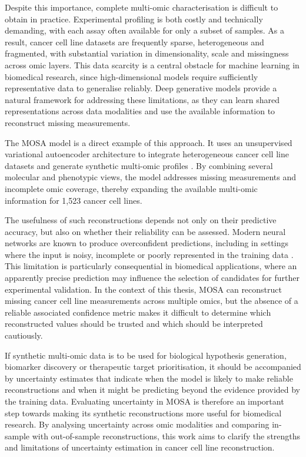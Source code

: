 Despite this importance, complete multi-omic characterisation is difficult to obtain in practice. Experimental profiling is both costly and technically demanding, with each assay often available for only a subset of samples. As a result, cancer cell line datasets are frequently sparse, heterogeneous and fragmented, with substantial variation in dimensionality, scale and missingness across omic layers. This data scarcity is a central obstacle for machine learning in biomedical research, since high-dimensional models require sufficiently representative data to generalise reliably. Deep generative models provide a natural framework for addressing these limitations, as they can learn shared representations across data modalities and use the available information to reconstruct missing measurements.

The \gls{MOSA} model is a direct example of this approach. It uses an unsupervised variational autoencoder architecture to integrate heterogeneous cancer cell line datasets and generate synthetic multi-omic profiles \cite{Cai2024}. By combining several molecular and phenotypic views, the model addresses missing measurements and incomplete omic coverage, thereby expanding the available multi-omic information for 1,523 cancer cell lines.

The usefulness of such reconstructions depends not only on their predictive accuracy, but also on whether their reliability can be assessed. Modern neural networks are known to produce overconfident predictions, including in settings where the input is noisy, incomplete or poorly represented in the training data \cite{Guo2017}. This limitation is particularly consequential in biomedical applications, where an apparently precise prediction may influence the selection of candidates for further experimental validation. In the context of this thesis, MOSA can reconstruct missing cancer cell line measurements across multiple omics, but the absence of a reliable associated confidence metric makes it difficult to determine which reconstructed values should be trusted and which should be interpreted cautiously.

If synthetic multi-omic data is to be used for biological hypothesis generation, biomarker discovery or therapeutic target prioritisation, it should be accompanied by uncertainty estimates that indicate when the model is likely to make reliable reconstructions and when it might be predicting beyond the evidence provided by the training data. Evaluating uncertainty in MOSA is therefore an important step towards making its synthetic reconstructions more useful for biomedical research. By analysing uncertainty across omic modalities and comparing in-sample with out-of-sample reconstructions, this work aims to clarify the strengths and limitations of uncertainty estimation in cancer cell line reconstruction.

